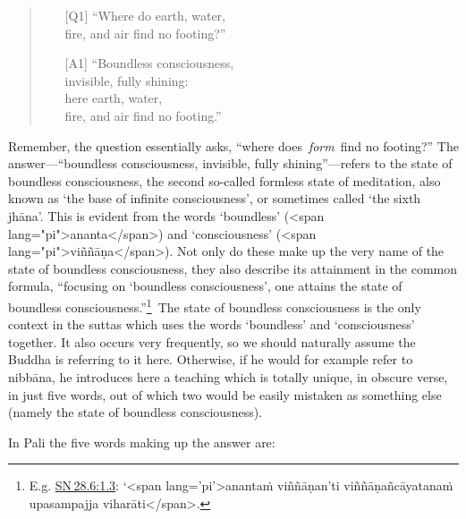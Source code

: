 \documentclass[10pt, openright]{book}
\begin{document}
\begin{quote}


\begin{itemize}

\item[{[Q1]}]“Where do earth, water, \\ fire, and air find no footing?”


\item[{[A1]}]“Boundless consciousness, \\ invisible, fully shining: \\ here earth, water, \\ fire, and air find no footing.”

\end{itemize}

\end{quote}
Remember, the question essentially asks, “where does \textit{form} find no footing?” The answer—“boundless consciousness, invisible, fully shining”—refers to the state of boundless consciousness, the second so-called formless state of meditation, also known as ‘the base of infinite consciousness’, or sometimes called ‘the sixth jhāna’. This is evident from the words ‘boundless’ (<span lang="pi">ananta</span>) and ‘consciousness’ (<span lang="pi">viññāṇa</span>). Not only do these make up the very name of the state of boundless consciousness, they also describe its attainment in the common formula, “focusing on ‘boundless consciousness’, one attains the state of boundless consciousness.”\footnote {E.g. \href{https://suttacentral.net/sn28.6/en/sujato\#1.3}{SN 28.6:1.3}: ‘<span lang='pi'>anantaṁ viññāṇan’ti viññāṇañcāyatanaṁ upasampajja viharāti</span>.} The state of boundless consciousness is the only context in the suttas which uses the words ‘boundless’ and ‘consciousness’ together. It also occurs very frequently, so we should naturally assume the Buddha is referring to it here. Otherwise, if he would for example refer to nibbāna, he introduces here a teaching which is totally unique, in obscure verse, in just five words, out of which two would be easily mistaken as something else (namely the state of boundless consciousness).


In Pali the five words making up the answer are:
\end{document}
